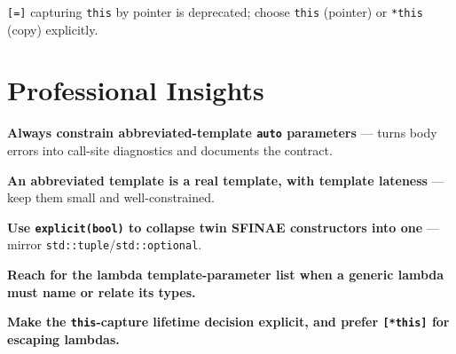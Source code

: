 \texttt{[=]} capturing \texttt{this} by pointer is deprecated; choose \texttt{this} (pointer) or \texttt{*this} (copy) explicitly.

\section{Professional Insights}
\label{sec:c20-abbreviated-insights}

\textbf{Always constrain abbreviated-template \texttt{auto} parameters} --- turns body errors into call-site diagnostics and documents the contract.

\textbf{An abbreviated template is a real template, with template lateness} --- keep them small and well-constrained.

\textbf{Use \texttt{explicit(bool)} to collapse twin SFINAE constructors into one} --- mirror \texttt{std::tuple}/\texttt{std::optional}.

\textbf{Reach for the lambda template-parameter list when a generic lambda must name or relate its types.}

\textbf{Make the \texttt{this}-capture lifetime decision explicit, and prefer \texttt{[*this]} for escaping lambdas.}
